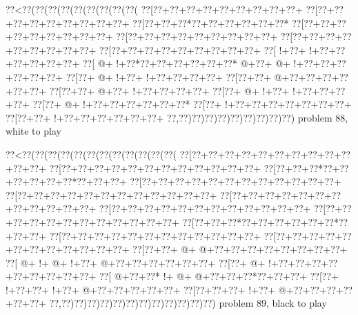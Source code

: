 \vbox{\vbox{\goo
\0??<\0??(\0??(\0??(\0??(\0??(\0??(\0??(\0??(\0??(
\0??[\0??+\0??+\0??+\0??+\0??+\0??+\0??+\0??+\0??+
\0??[\0??+\0??+\0??+\0??+\0??+\0??+\0??+\0??+\0??+
\0??[\0??+\0??+\0??*\0??+\0??+\0??+\0??+\0??+\0??*
\0??[\0??+\0??+\0??+\0??+\0??+\0??+\0??+\0??+\0??+
\0??[\0??+\0??+\0??+\0??+\0??+\0??+\0??+\0??+\0??+
\0??[\0??+\0??+\0??+\0??+\0??+\0??+\0??+\0??+\0??+
\0??[\0??+\0??+\0??+\0??+\0??+\0??+\0??+\0??+\0??+
\0??[\- !+\0??+\- !+\0??+\0??+\0??+\0??+\0??+\0??+
\0??[\- @+\- !+\0??*\0??+\0??+\0??+\0??+\0??+\0??*
\- @+\0??+\- @+\- !+\0??+\0??+\0??+\0??+\0??+\0??+
\0??[\0??+\- @+\- !+\0??+\- !+\0??+\0??+\0??+\0??+
\0??[\0??+\0??+\- @+\0??+\0??+\0??+\0??+\0??+\0??+
\0??[\0??+\0??+\- @+\0??+\- !+\0??+\0??+\0??+\0??+
\0??[\0??+\- @+\- !+\0??+\- !+\0??+\0??+\0??+\0??+
\0??[\0??+\- @+\- !+\0??+\0??+\0??+\0??+\0??+\0??*
\0??[\0??+\- !+\0??+\0??+\0??+\0??+\0??+\0??+\0??+
\0??[\0??+\0??+\- !+\0??+\0??+\0??+\0??+\0??+\0??+
\0??,\0??)\0??)\0??)\0??)\0??)\0??)\0??)\0??)\0??)
}
\hfil problem 88, white to play\hfil\break
}

\vbox{\vbox{\goo
\0??<\0??(\0??(\0??(\0??(\0??(\0??(\0??(\0??(\0??(\0??(\0??(\0??(
\0??[\0??+\0??+\0??+\0??+\0??+\0??+\0??+\0??+\0??+\0??+\0??+\0??+
\0??[\0??+\0??+\0??+\0??+\0??+\0??+\0??+\0??+\0??+\0??+\0??+\0??+
\0??[\0??+\0??+\0??*\0??+\0??+\0??+\0??+\0??+\0??*\0??+\0??+\0??+
\0??[\0??+\0??+\0??+\0??+\0??+\0??+\0??+\0??+\0??+\0??+\0??+\0??+
\0??[\0??+\0??+\0??+\0??+\0??+\0??+\0??+\0??+\0??+\0??+\0??+\0??+
\0??[\0??+\0??+\0??+\0??+\0??+\0??+\0??+\0??+\0??+\0??+\0??+\0??+
\0??[\0??+\0??+\0??+\0??+\0??+\0??+\0??+\0??+\0??+\0??+\0??+\0??+
\0??[\0??+\0??+\0??+\0??+\0??+\0??+\0??+\0??+\0??+\0??+\0??+\0??+
\0??[\0??+\0??+\0??*\0??+\0??+\0??+\0??+\0??+\0??*\0??+\0??+\0??+
\0??[\0??+\0??+\0??+\0??+\0??+\0??+\0??+\0??+\0??+\0??+\0??+\0??+
\0??[\0??+\0??+\0??+\0??+\0??+\0??+\0??+\0??+\0??+\0??+\0??+\0??+
\0??[\0??+\0??+\- @+\- @+\0??+\0??+\0??+\0??+\0??+\0??+\0??+\0??+
\0??[\- @+\- !+\- @+\- !+\0??+\- @+\0??+\0??+\0??+\0??+\0??+\0??+
\0??[\0??+\- @+\- !+\0??+\0??+\0??+\0??+\0??+\0??+\0??+\0??+\0??+
\0??[\- @+\0??+\0??*\- !+\- @+\- @+\0??+\0??+\0??*\0??+\0??+\0??+
\0??[\0??+\- !+\0??+\0??+\- !+\0??+\- @+\0??+\0??+\0??+\0??+\0??+
\0??[\0??+\0??+\0??+\- !+\0??+\- @+\0??+\0??+\0??+\0??+\0??+\0??+
\0??,\0??)\0??)\0??)\0??)\0??)\0??)\0??)\0??)\0??)\0??)\0??)\0??)
}
\hfil problem 89, black to play\hfil\break
}

